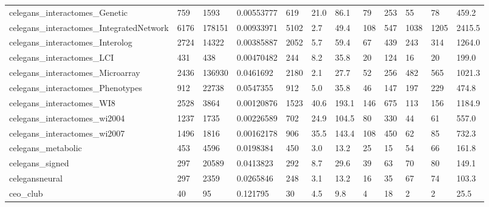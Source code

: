 \begin{longtable}{llllllllllll}
 celegans\_interactomes\_Genetic                      & 759        & 1593      & 0.00553777  & 619   & 21.0   & 86.1   & 79    & 253    & 55     & 78     & 459.2   \\
 celegans\_interactomes\_IntegratedNetwork            & 6176       & 178151    & 0.00933971  & 5102  & 2.7    & 49.4   & 108   & 547    & 1038   & 1205   & 2415.5  \\
 celegans\_interactomes\_Interolog                    & 2724       & 14322     & 0.00385887  & 2052  & 5.7    & 59.4   & 67    & 439    & 243    & 314    & 1264.0  \\
 celegans\_interactomes\_LCI                          & 431        & 438       & 0.00470482  & 244   & 8.2    & 35.8   & 20    & 124    & 16     & 20     & 199.0   \\
 celegans\_interactomes\_Microarray                   & 2436       & 136930    & 0.0461692   & 2180  & 2.1    & 27.7   & 52    & 256    & 482    & 565    & 1021.3  \\
 celegans\_interactomes\_Phenotypes                   & 912        & 22738     & 0.0547355   & 912   & 5.0    & 35.8   & 46    & 147    & 197    & 229    & 474.8   \\
 celegans\_interactomes\_WI8                          & 2528       & 3864      & 0.00120876  & 1523  & 40.6   & 193.1  & 146   & 675    & 113    & 156    & 1184.9  \\
 celegans\_interactomes\_wi2004                       & 1237       & 1735      & 0.00226589  & 702   & 24.9   & 104.5  & 80    & 330    & 44     & 61     & 557.0   \\
 celegans\_interactomes\_wi2007                       & 1496       & 1816      & 0.00162178  & 906   & 35.5   & 143.4  & 108   & 450    & 62     & 85     & 732.3   \\
 celegans\_metabolic                                 & 453        & 4596      & 0.0198384   & 450   & 3.0    & 13.2   & 25    & 15     & 54     & 66     & 161.8   \\
 celegans\_signed                                    & 297        & 20589     & 0.0413823   & 292   & 8.7    & 29.6   & 39    & 63     & 70     & 80     & 149.1   \\
 celegansneural                                     & 297        & 2359      & 0.0265846   & 248   & 3.1    & 13.2   & 16    & 35     & 67     & 74     & 103.3   \\
 ceo\_club                                           & 40         & 95        & 0.121795    & 30    & 4.5    & 9.8    & 4     & 18     & 2      & 2      & 25.5    \\

\end{longtable}
